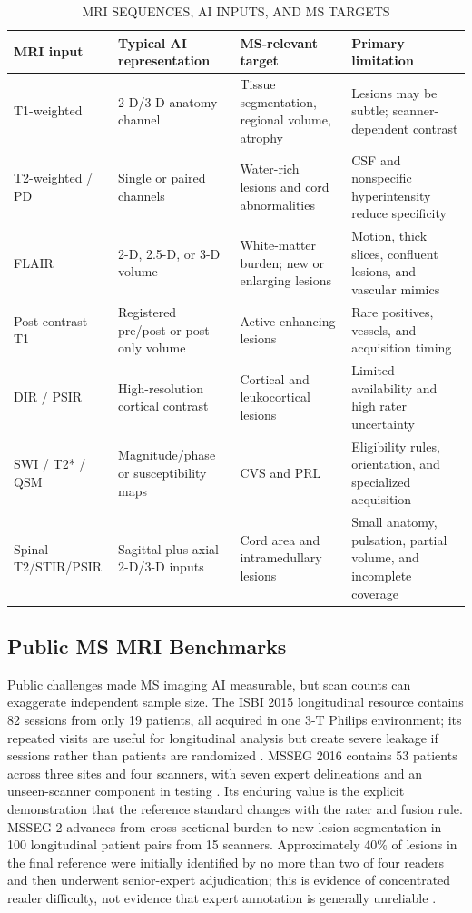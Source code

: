 \documentclass[journal,twoside,web]{ieeecolor}
\begin{document}
\begin{table}[!t]
\centering
\caption{MRI SEQUENCES, AI INPUTS, AND MS TARGETS}
\label{tab:1}
\scriptsize
\setlength{\tabcolsep}{2.2pt}
\renewcommand{\arraystretch}{1.10}
\begin{tabularx}{\textwidth}{@{}YYYY@{}}
\toprule
\textbf{MRI input} & \textbf{Typical AI representation} & \textbf{MS-relevant target} & \textbf{Primary limitation} \\
\midrule
T1-weighted & 2-D/3-D anatomy channel & Tissue segmentation, regional volume, atrophy & Lesions may be subtle; scanner-dependent contrast \\
T2-weighted / PD & Single or paired channels & Water-rich lesions and cord abnormalities & CSF and nonspecific hyperintensity reduce specificity \\
FLAIR & 2-D, 2.5-D, or 3-D volume & White-matter burden; new or enlarging lesions & Motion, thick slices, confluent lesions, and vascular mimics \\
Post-contrast T1 & Registered pre/post or post-only volume & Active enhancing lesions & Rare positives, vessels, and acquisition timing \\
DIR / PSIR & High-resolution cortical contrast & Cortical and leukocortical lesions & Limited availability and high rater uncertainty \\
SWI / T2* / QSM & Magnitude/phase or susceptibility maps & CVS and PRL & Eligibility rules, orientation, and specialized acquisition \\
Spinal T2/STIR/PSIR & Sagittal plus axial 2-D/3-D inputs & Cord area and intramedullary lesions & Small anatomy, pulsation, partial volume, and incomplete coverage \\
\bottomrule
\end{tabularx}
\end{table}

\subsection{Public MS MRI Benchmarks}\label{subsec:public-ms-mri-benchmarks}

Public challenges made MS imaging AI measurable, but scan counts can exaggerate independent sample size. The ISBI 2015 longitudinal resource contains 82 sessions from only 19 patients, all acquired in one 3-T Philips environment; its repeated visits are useful for longitudinal analysis but create severe leakage if sessions rather than patients are randomized \cite{carass2017,carass_data}. MSSEG 2016 contains 53 patients across three sites and four scanners, with seven expert delineations and an unseen-scanner component in testing \cite{msseg_descriptor,msseg_challenge}. Its enduring value is the explicit demonstration that the reference standard changes with the rater and fusion rule. MSSEG-2 advances from cross-sectional burden to new-lesion segmentation in 100 longitudinal patient pairs from 15 scanners. Approximately 40\% of lesions in the final reference were initially identified by no more than two of four readers and then underwent senior-expert adjudication; this is evidence of concentrated reader difficulty, not evidence that expert annotation is generally unreliable \cite{msseg2}.
\end{document}
